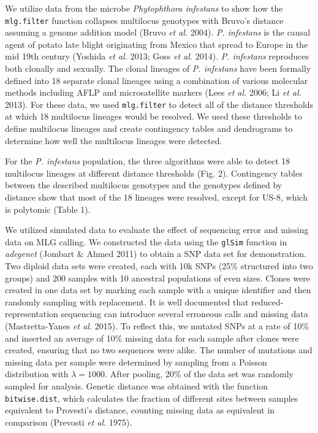 \documentclass[double,12pt]{beavtex}
\begin{document}
  We utilize data from the microbe \emph{Phytophthora infestans} to show
  how the \texttt{mlg.filter} function collapses multilocus genotypes with
  Bruvo's distance assuming a genome addition model (Bruvo \emph{et al.}
  2004). \emph{P. infestans} is the causal agent of potato late blight
  originating from Mexico that spread to Europe in the mid 19th century
  (Yoshida \emph{et al.} 2013; Goss \emph{et al.} 2014). \emph{P.
  infestans} reproduces both clonally and sexually. The clonal lineages of
  \emph{P. infestans} have been formally defined into 18 separate clonal
  lineages using a combination of various molecular methods including AFLP
  and microsatellite markers (Lees \emph{et al.} 2006; Li \emph{et al.}
  2013). For these data, we used \texttt{mlg.filter} to detect all of the
  distance thresholds at which 18 multilocus lineages would be resolved.
  We used these thresholds to define multilocus lineages and create
  contingency tables and dendrograms to determine how well the multilocus
  lineages were detected.
  
  For the \emph{P. infestans} population, the three algorithms were able
  to detect 18 multilocus lineages at different distance thresholds (Fig.
  2). Contingency tables between the described multilocus genotypes and
  the genotypes defined by distance show that most of the 18 lineages were
  resolved, except for US-8, which is polytomic (Table 1).
  
  We utilized simulated data to evaluate the effect of sequencing error
  and missing data on MLG calling. We constructed the data using the
  \texttt{glSim} function in \emph{adegenet} (Jombart \& Ahmed 2011) to
  obtain a SNP data set for demonstration. Two diploid data sets were
  created, each with 10k SNPs (25\% structured into two groups) and 200
  samples with 10 ancestral populations of even sizes. Clones were created
  in one data set by marking each sample with a unique identifier and then
  randomly sampling with replacement. It is well documented that reduced-
  representation sequencing can introduce several erroneous calls and
  missing data (Mastretta-Yanes \emph{et al.} 2015). To reflect this, we
  mutated SNPs at a rate of 10\% and inserted an average of 10\% missing
  data for each sample after clones were created, ensuring that no two
  sequences were alike. The number of mutations and missing data per
  sample were determined by sampling from a Poisson distribution with
  \(\lambda = 1000\). After pooling, 20\% of the data set was randomly
  sampled for analysis. Genetic distance was obtained with the function
  \texttt{bitwise.dist}, which calculates the fraction of different sites
  between samples equivalent to Provesti's distance, counting missing data
  as equivalent in comparison (Prevosti \emph{et al.} 1975).
  
\end{document}
